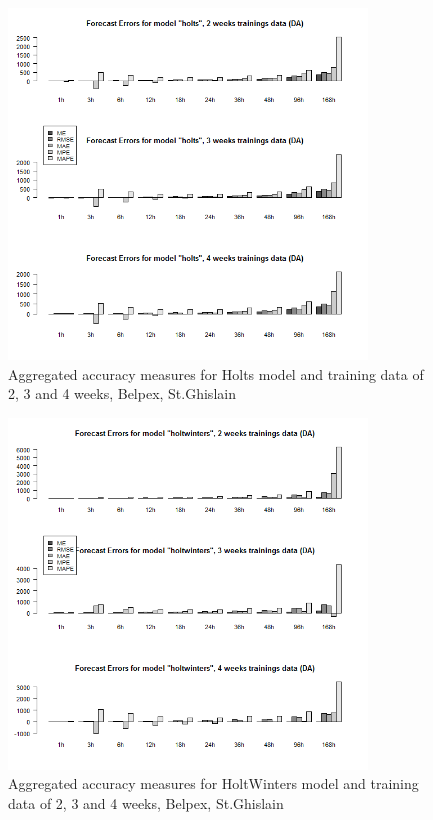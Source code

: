 \begin{figure}[!ht]
	\centering
		\includegraphics[width=0.85\textwidth]{figures/appendix_forecast_results/da_sim_2_x_1w_1w_holts.png}
	\caption{Aggregated accuracy measures for Holts model and training data of 2, 3 and 4 weeks, Belpex, St.Ghislain}
	\label{fig:app_da_sim_2_x_1w_1w_holts}
	\vspace*{-1.6in}
\end{figure}




\begin{figure}[!ht]
	\centering
	\vspace*{-1.2in}
		\includegraphics[width=0.85\textwidth]{figures/appendix_forecast_results/da_sim_2_x_1w_1w_holtwinters.png}
	\caption{Aggregated accuracy measures for HoltWinters model and training data of 2, 3 and 4 weeks, Belpex, St.Ghislain}
	\label{fig:app_da_sim_2_x_1w_1w_holtwinters}
\end{figure}

